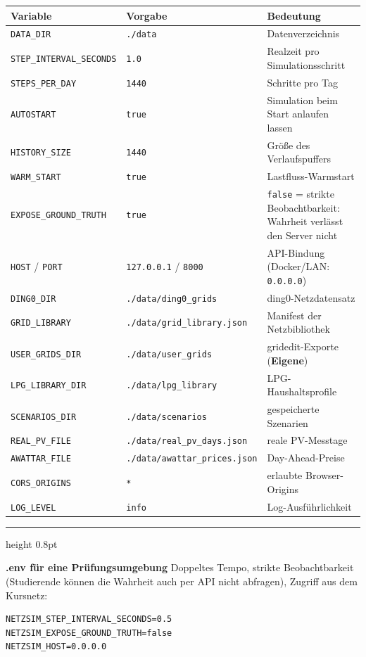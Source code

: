 \documentclass[11pt,a4paper,parskip=half]{scrreprt}
\newcommand{\ui}[1]{\textsf{\bfseries #1}}          %
\newenvironment{beispiel}[1][Beispiel]
  {\par\medskip
   {\color{bsp}\hrule height 0.8pt}\nopagebreak\smallskip
   \noindent\textbf{\textsf{\textcolor{bsp}{#1}}}\quad\ignorespaces}
  {\par\nopagebreak\smallskip{\color{bsp}\hrule height 0.8pt}\par\medskip}
\begin{document}
{\small
\begin{longtable}{@{}p{}p{}p{}@{}}
\toprule
Variable & Vorgabe & Bedeutung \\
\midrule
\endhead
\texttt{DATA\_DIR} & \texttt{./data} & Datenverzeichnis \\
\texttt{STEP\_INTERVAL\_SECONDS} & \texttt{1.0} & Realzeit pro Simulationsschritt \\
\texttt{STEPS\_PER\_DAY} & \texttt{1440} & Schritte pro Tag \\
\texttt{AUTOSTART} & \texttt{true} & Simulation beim Start anlaufen lassen \\
\texttt{HISTORY\_SIZE} & \texttt{1440} & Größe des Verlaufspuffers \\
\texttt{WARM\_START} & \texttt{true} & Lastfluss-Warmstart \\
\texttt{EXPOSE\_GROUND\_TRUTH} & \texttt{true} & \texttt{false} = strikte Beobachtbarkeit: Wahrheit verlässt den Server nicht \\
\texttt{HOST} / \texttt{PORT} & \texttt{127.0.0.1} / \texttt{8000} & API-Bindung (Docker/LAN: \texttt{0.0.0.0}) \\
\texttt{DING0\_DIR} & \texttt{./data/}\allowbreak\texttt{ding0\_grids} & ding0-Netzdatensatz \\
\texttt{GRID\_LIBRARY} & \texttt{./data/}\allowbreak\texttt{grid\_library.json} & Manifest der Netzbibliothek \\
\texttt{USER\_GRIDS\_DIR} & \texttt{./data/}\allowbreak\texttt{user\_grids} & gridedit-Exporte (\ui{Eigene}) \\
\texttt{LPG\_LIBRARY\_DIR} & \texttt{./data/}\allowbreak\texttt{lpg\_library} & LPG-Haushaltsprofile \\
\texttt{SCENARIOS\_DIR} & \texttt{./data/}\allowbreak\texttt{scenarios} & gespeicherte Szenarien \\
\texttt{REAL\_PV\_FILE} & \texttt{./data/}\allowbreak\texttt{real\_pv\_days.json} & reale PV-Messtage \\
\texttt{AWATTAR\_FILE} & \texttt{./data/}\allowbreak\texttt{awattar\_prices.json} & Day-Ahead-Preise \\
\texttt{CORS\_ORIGINS} & \texttt{*} & erlaubte Browser-Origins \\
\texttt{LOG\_LEVEL} & \texttt{info} & Log-Ausführlichkeit \\
\bottomrule
\end{longtable}
}

\begin{beispiel}[.env für eine Prüfungsumgebung]
Doppeltes Tempo, strikte Beobachtbarkeit (Studierende können die
Wahrheit auch per API nicht abfragen), Zugriff aus dem Kursnetz:
\begin{lstlisting}
NETZSIM_STEP_INTERVAL_SECONDS=0.5
NETZSIM_EXPOSE_GROUND_TRUTH=false
NETZSIM_HOST=0.0.0.0
\end{lstlisting}
\end{beispiel}
\end{document}
